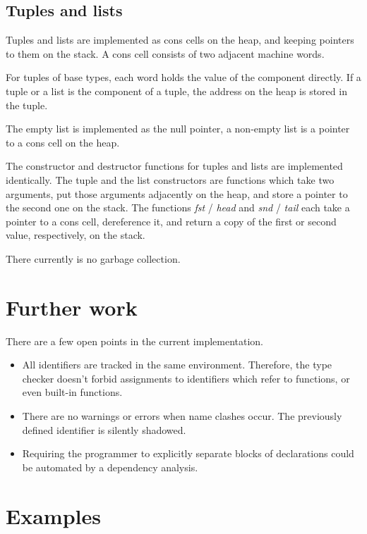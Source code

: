 \documentclass[a4paper]{article}
\begin{document}
\subsection{Tuples and lists}

Tuples and lists are implemented as cons cells on the heap, and keeping
pointers to them on the stack.  A cons cell consists of two adjacent machine
words.

For tuples of base types, each word holds the value of the component directly.
If a tuple or a list is the component of a tuple, the address on the heap is
stored in the tuple.

The empty list is implemented as the null pointer, a non-empty list is a pointer
to a cons cell on the heap.

The constructor and destructor functions for tuples and lists are implemented
identically.  The tuple and the list constructors are functions which take two
arguments, put those arguments adjacently on the heap, and store a pointer to
the second one on the stack.  The functions \emph{fst} / \emph{head} and
\emph{snd} / \emph{tail} each take a pointer to a cons cell, dereference it, and
return a copy of the first or second value, respectively, on the stack.

There currently is no garbage collection.


\section{Further work}

There are a few open points in the current implementation.

\begin{itemize}

  \item All identifiers are tracked in the same environment.  Therefore, the
  type checker doesn't forbid assignments to identifiers which refer to
  functions, or even built-in functions.

  \item There are no warnings or errors when name clashes occur.  The previously
  defined identifier is silently shadowed.

  \item Requiring the programmer to explicitly separate blocks of declarations
  could be automated by a dependency analysis.

\end{itemize}


\section{Examples}
\end{document}
